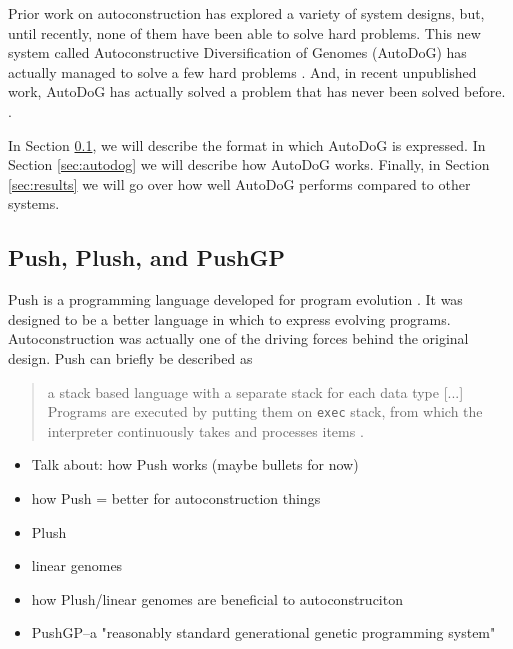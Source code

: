\documentclass{sig-alternate}
\begin{document}
Prior work on autoconstruction has explored a variety of system designs, but, until recently, none of them have been able to solve hard problems. This new system called Autoconstructive Diversification of Genomes (AutoDoG) has actually managed to solve a few hard problems \cite{spector:2016}. And, in recent unpublished work, AutoDoG has actually solved a problem that has never been solved before. \cite{Eva:autoconstruction}.

In Section \ref{sec:push}, we will describe the format in which AutoDoG is expressed. In Section \ref{sec:autodog} we will describe how AutoDoG works. Finally, in Section \ref{sec:results} we will go over how well AutoDoG performs compared to other systems.

\subsection{Push, Plush, and PushGP}
\label{sec:push}

Push is a programming language developed for program evolution \cite{spector:2016}. It was designed to be a better language in which to express evolving programs. Autoconstruction was actually one of the driving forces behind the original design. Push can briefly be described as

\begin{quotation}
	a stack based language with a separate stack for each data type [...] Programs are executed by putting them on \texttt{exec} stack, from which the interpreter continuously takes and processes items \cite{spector:2016}.
\end{quotation}


\begin{itemize}
	\item Talk about: how Push works (maybe bullets for now)
	\item how Push = better for autoconstruction things
	\item Plush
	\item linear genomes
	\item how Plush/linear genomes are beneficial to autoconstruciton
	\item PushGP--a "reasonably standard generational genetic programming system"
\end{itemize}
\end{document}
